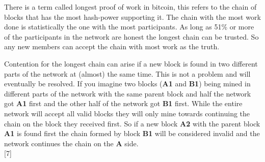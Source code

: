 There is a term called longest proof of work in bitcoin, this refers to the chain of blocks that has the most hash-power supporting it. The chain with the most work done is statistically the one with the most participants. As long as 51\% or more of the participants in the network are honest the longest chain can be trusted. So any new members can accept the chain with most work as the truth.\cite{antonopoulos_2017}


Contention for the longest chain can arise if a new block is found in two different parts of the network at (almost) the same time. This is not a problem and will eventually be resolved. If you imagine two blocks (\textbf{A1} and \textbf{B1}) being mined in different parts of the network with the same parent block and half the network got \textbf{A1} first and the other half of the network got \textbf{B1} first. While the entire network will accept all valid blocks they will only mine towards continuing the chain on the block they received first. So if a new block \textbf{A2} with the parent block \textbf{A1} is found first the chain formed by block \textbf{B1} will be considered invalid and the network continues the chain on the \textbf{A} side.\cite{antonopoulos_2017}\\

[7]



